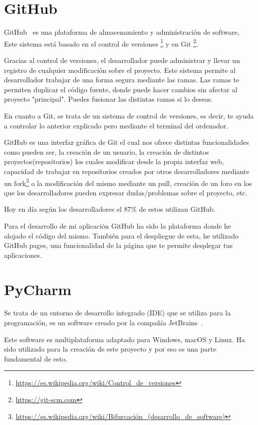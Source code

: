 \documentclass[a4paper, 12pt]{book}
\begin{document}
\section{GitHub} %
\label{sec:GitHub}
GitHub~\cite{GITHUB} es una plataforma de almacenamiento y administración  de software, Este sistema está basado en el control de versiones \footnote{\url{https://es.wikipedia.org/wiki/Control_de_versiones}} y en Git \footnote{\url{https://git-scm.com}}.

Gracias al control de versiones, el desarrollador puede administrar y llevar un registro de cualquier modificación sobre el proyecto. Este sistema permite al desarrollador trabajar de una forma segura mediante las ramas. Las ramas te permiten duplicar el código fuente, donde puede hacer cambios sin afectar al proyecto "principal". Puedes fusionar las distintas ramas si lo deseas.

En cuanto a Git, se trata de un sistema de control de versiones, es decir, te ayuda a controlar lo anterior explicado pero mediante el terminal del ordenador.

GitHub es una interfaz gráfica de Git el cual nos ofrece distintas funcionalidades como pueden ser, la creación de un usuario, la creación de distintos proyectos(repositorios) los cuales modificar desde la propia interfaz web, capacidad de trabajar en repositorios creados por otros desarrolladores mediante un fork\footnote{\url{https://es.wikipedia.org/wiki/Bifurcación_(desarrollo_de_software)}} o la modificación del mismo mediante un pull, creación de un foro en los que los desarrolladores pueden expresar dudas/problemas sobre el proyecto, etc.

Hoy en día según los desarrolladores  el 87\% de estos utilizan GitHub.

Para el desarrollo de mi aplicación GitHub ha sido la plataforma donde he alojado el código del mismo. También para el despliegue de esta, he utilizado GitHub pages, una funcionalidad de la página que te permite desplegar tus aplicaciones.

\section{PyCharm} %
\label{sec:GitHub}
Se trata de un entorno de desarrollo integrado (IDE) que se utiliza para la programación, es un software creado por la compañía JetBrains~\cite{jetbrains}.

Este software es multiplataforma adaptado para Windows, macOS y Linux. Ha sido utilizado para la creación de este proyecto y por eso es una parte fundamental de esto.
\end{document}
